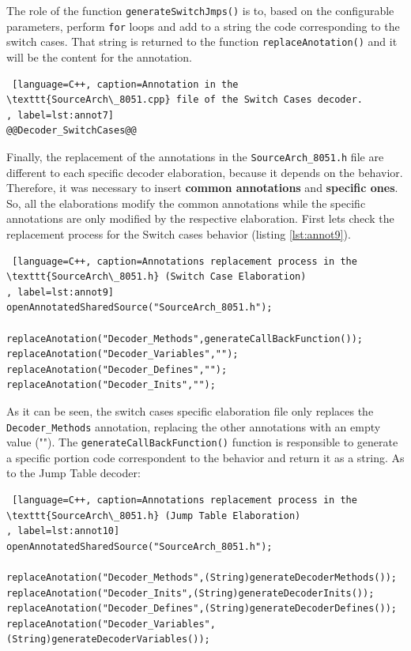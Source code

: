 The role of the function \texttt{generateSwitchJmps()} is to, based on the configurable parameters, perform \texttt{for} loops and add to a string the code corresponding to the switch cases. That string is returned to the function \texttt{replaceAnotation()} and it will be the content for the annotation.

\begin{lstlisting} [language=C++, caption=Annotation in the \texttt{SourceArch\_8051.cpp} file of the Switch Cases decoder.
, label=lst:annot7]
@@Decoder_SwitchCases@@
\end{lstlisting}


Finally, the replacement of the annotations in the \texttt{SourceArch\_8051.h} file are different to each specific decoder elaboration, because it depends on the behavior. Therefore, it was necessary to insert \textbf{common annotations} and \textbf{specific ones}. So, all the elaborations modify the common annotations while the specific annotations are only modified by the respective elaboration. First lets check the replacement process for the Switch cases behavior (listing \ref{lst:annot9}).

\begin{lstlisting} [language=C++, caption=Annotations replacement process in the \texttt{SourceArch\_8051.h} (Switch Case Elaboration)
, label=lst:annot9]
openAnnotatedSharedSource("SourceArch_8051.h");

replaceAnotation("Decoder_Methods",generateCallBackFunction());
replaceAnotation("Decoder_Variables","");
replaceAnotation("Decoder_Defines","");
replaceAnotation("Decoder_Inits","");
\end{lstlisting}

As it can be seen, the switch cases specific elaboration file only replaces the \texttt{Decoder\_Methods} annotation, replacing the other annotations with an empty value (""). The \texttt{generateCallBackFunction()} function is responsible to generate a specific portion code correspondent to the behavior and return it as a string. As to the Jump Table decoder: 

\begin{lstlisting} [language=C++, caption=Annotations replacement process in the \texttt{SourceArch\_8051.h} (Jump Table Elaboration)
, label=lst:annot10]
openAnnotatedSharedSource("SourceArch_8051.h");
		
replaceAnotation("Decoder_Methods",(String)generateDecoderMethods());
replaceAnotation("Decoder_Inits",(String)generateDecoderInits());
replaceAnotation("Decoder_Defines",(String)generateDecoderDefines());
replaceAnotation("Decoder_Variables",(String)generateDecoderVariables());
\end{lstlisting}

